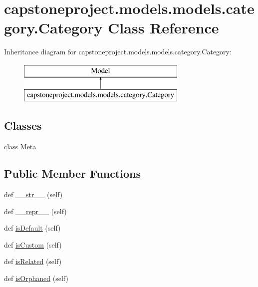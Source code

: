 \hypertarget{classcapstoneproject_1_1models_1_1models_1_1category_1_1_category}{}\section{capstoneproject.\+models.\+models.\+category.\+Category Class Reference}
\label{classcapstoneproject_1_1models_1_1models_1_1category_1_1_category}
Inheritance diagram for capstoneproject.\+models.\+models.\+category.\+Category\+:\begin{figure}[H]
\begin{center}
\leavevmode
\includegraphics[height=2.000000cm]{classcapstoneproject_1_1models_1_1models_1_1category_1_1_category}
\end{center}
\end{figure}
\subsection*{Classes}
\begin{DoxyCompactItemize}
\item 
class \mbox{\hyperlink{classcapstoneproject_1_1models_1_1models_1_1category_1_1_category_1_1_meta}{Meta}}
\end{DoxyCompactItemize}
\subsection*{Public Member Functions}
\begin{DoxyCompactItemize}
\item 
def \mbox{\hyperlink{classcapstoneproject_1_1models_1_1models_1_1category_1_1_category_ac82aee120190ed17cbe05a413a1dda24}{\+\_\+\+\_\+str\+\_\+\+\_\+}} (self)
\item 
def \mbox{\hyperlink{classcapstoneproject_1_1models_1_1models_1_1category_1_1_category_afe100593a8db752b806a253f93ff10cf}{\+\_\+\+\_\+repr\+\_\+\+\_\+}} (self)
\item 
def \mbox{\hyperlink{classcapstoneproject_1_1models_1_1models_1_1category_1_1_category_af1932495f6574ea8cfabc3ce40e9b8d0}{is\+Default}} (self)
\item 
def \mbox{\hyperlink{classcapstoneproject_1_1models_1_1models_1_1category_1_1_category_a9e49b76788e6c3a4d1a85e9c3449cb6b}{is\+Custom}} (self)
\item 
def \mbox{\hyperlink{classcapstoneproject_1_1models_1_1models_1_1category_1_1_category_a06d132bc2c34f2fa0591f9580aa21d32}{is\+Related}} (self)
\item 
def \mbox{\hyperlink{classcapstoneproject_1_1models_1_1models_1_1category_1_1_category_a08f12b4c20d985a0a1b57491d73463e6}{is\+Orphaned}} (self)
\end{DoxyCompactItemize}
